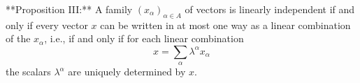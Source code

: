 **Proposition III:** A family $(x_\alpha)_{\alpha \in A}$ of vectors is linearly independent if and only if every vector $x$ can be written in at most one way as a linear combination of the $x_\alpha$, i.e., if and only if for each linear combination
$$x = \sum_\alpha \lambda^\alpha x_\alpha$$
the scalars $\lambda^\alpha$ are uniquely determined by $x$.
